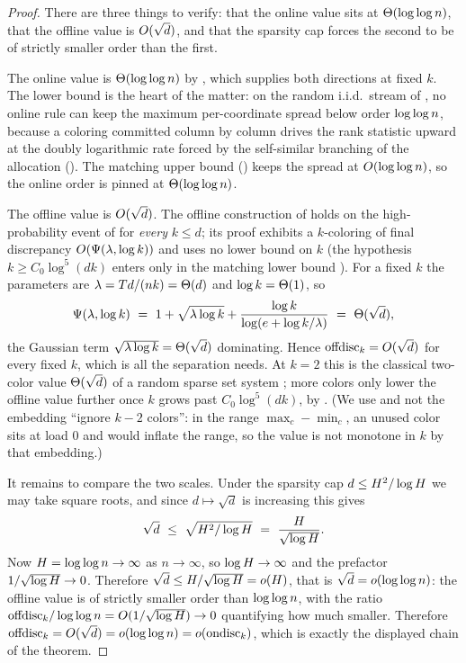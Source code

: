 \begin{proof}
There are three things to verify: that the online value sits at $\Theta(\log\log n)$, that the offline value is $O(\sqrt d)$,
and that the sparsity cap forces the second to be of strictly smaller order than the first.

The online value is $\Theta(\log\log n)$ by , which supplies both directions at fixed $k$. The lower bound is
the heart of the matter: on the random i.i.d.\ stream of , no online rule can keep the maximum per-coordinate
spread below order $\log\log n$, because a coloring committed column by column drives the rank statistic upward at the doubly
logarithmic rate forced by the self-similar branching of the allocation (). The matching upper bound
() keeps the spread at $O(\log\log n)$, so the online order is pinned at $\Theta(\log\log n)$.

The offline value is $O(\sqrt d)$. The offline construction of  holds on the high-probability event
of  for \emph{every} $k\le d$; its proof exhibits a $k$-coloring of final discrepancy
$O(\Psi(\lambda,\log k))$ and uses no lower bound on $k$ (the hypothesis $k\ge C_0\log^5(dk)$ enters only in the matching
lower bound ). For a fixed $k$ the parameters are $\lambda=Td/(nk)=\Theta(d)$ and $\log k=\Theta(1)$, so
\[
  \Psi(\lambda,\log k)\ =\ 1+\sqrt{\lambda\log k}+\frac{\log k}{\log(e+\log k/\lambda)}\ =\ \Theta(\sqrt d),
\]
the Gaussian term $\sqrt{\lambda\log k}=\Theta(\sqrt d)$ dominating. Hence $\mathrm{offdisc}_k=O(\sqrt d)$ for every fixed $k$, which is
all the separation needs. At $k=2$ this is the classical two-color value $\Theta(\sqrt d)$ of a random sparse set system
\cite{BansalMeka2019,EzraLovett2016,HobergRothvoss2019}; more colors only lower the offline value further once $k$ grows past
$C_0\log^5(dk)$, by . (We use  and not the embedding ``ignore $k-2$ colors'': in
the range $\max_c-\min_c$, an unused color sits at load $0$ and would inflate the range, so the value is not monotone in $k$
by that embedding.)

It remains to compare the two scales. Under the sparsity cap $d\le H^2/\log H$ we may take square roots, and since
$d\mapsto\sqrt d$ is increasing this gives
\[
  \sqrt d\ \le\ \sqrt{\Hscale^2/\log\Hscale}\ =\ \frac{\Hscale}{\sqrt{\log\Hscale}} .
\]
Now $H=\log\log n\to\infty$ as $n\to\infty$, so $\log H\to\infty$ and the prefactor $1/\sqrt{\log H}\to0$.
Therefore $\sqrt d\le H/\sqrt{\log H}=o(H)$, that is $\sqrt d=o(\log\log n)$: the offline value is of strictly
smaller order than $\log\log n$, with the ratio $\mathrm{offdisc}_k/\log\log n=O(1/\sqrt{\log H})\to0$ quantifying how much
smaller. Therefore $\mathrm{offdisc}_k=O(\sqrt d)=o(\log\log n)=o(\mathrm{ondisc}_k)$, which is exactly the displayed chain of the theorem.
\end{proof}

